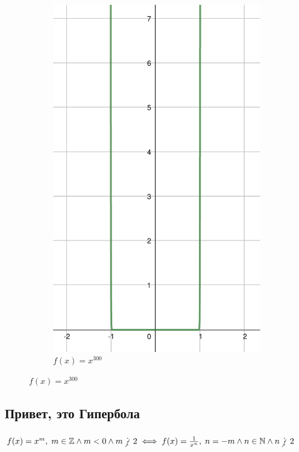 \begin{figure}[h]
\begin{subfigure}{0.35\textwidth}
        \includegraphics[width=\textwidth]{tex/chapter_1/assets/y=x^300.pdf}
        \caption*{$f(x) = x^{300}$}
    \end{subfigure}
\end{figure}

\subsection{Привет, это Гипербола}

$f(x) = x^m, \; m \in \mathbb{Z} \land m < 0 \land m \notdivisible 2 \iff f(x) = \frac{1}{x^n}, \; n = -m \land n \in \mathbb{N} \land n \notdivisible 2$ \\


